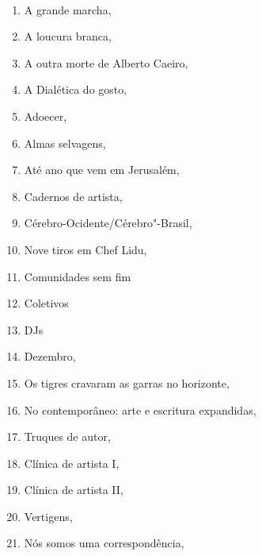 {}
\pagestyle{empty}

\begingroup
\tiny

{}\\

\begin{multicols}{2}
\begin{enumerate}
\setlength\parskip{8pt}
\setlength\itemsep{-1.4mm}
\item A grande marcha, {}
\item A loucura branca, {}
\item A outra morte de Alberto Caeiro, {}
\item A Dialética do gosto, {}
\item Adoecer, {}
\item Almas selvagens, {}
\item Até ano que vem em Jerusalém, {}
\item Cadernos de artista, {}
\item Cérebro-Ocidente/Cérebro"-Brasil, {}
\item Nove tiros em Chef Lidu, {}
\item Comunidades sem fim
\item Coletivos
\item DJs
\item Dezembro, {}
\item Os tigres cravaram as garras no horizonte, {}
\item No contemporâneo: arte e escritura expandidas, {}
\item Truques de autor, {}
\item Clínica de artista I, {}
\item Clínica de artista II, {}
\item Vertigens, {}
\item Nós somos uma correspondência, {}

\end{enumerate}
\end{multicols}
